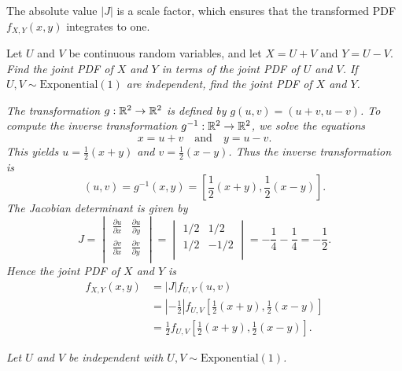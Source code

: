 \begin{remark}
The absolute value $|J|$ is a scale factor, which ensures that the transformed PDF $f_{X,Y}(x,y)$ integrates to one.
\end{remark}

\begin{example}
Let $U$ and $V$ be continuous random variables, and let $X=U+V$ and $Y=U-V$. 
\ben
\it Find the joint PDF of $X$ and $Y$ in terms of the joint PDF of $U$ and $V$.
\it If $U,V\sim\text{Exponential}(1)$ are independent, find the joint PDF of $X$ and $Y$.
\een
\end{example}

\begin{solution}
\ben

\it %
\bit
\it The transformation $g:\mathbb{R}^2\to\mathbb{R}^2$ is defined by $g(u,v) = (u+v,u-v)$. 
\it To compute the inverse transformation $g^{-1}:\mathbb{R}^2\to\mathbb{R}^2$, we solve the equations %
\[
x=u+v \quad\text{and}\quad y=u-v.%
\]
\it This yields $u = \frac{1}{2}(x+y)$ and $v = \frac{1}{2}(x-y)$.
\it Thus the inverse transformation is 
\[
(u,v) = g^{-1}(x,y) = \left[\frac{1}{2}(x+y),\frac{1}{2}(x-y)\right].
\]
\eit
The Jacobian determinant is given by
\[
J = 
\begin{vmatrix}
\displaystyle\frac{\partial u}{\partial x} & \displaystyle\frac{\partial u}{\partial y} \\[2ex]
\displaystyle\frac{\partial v}{\partial x} & \displaystyle\frac{\partial v}{\partial y} \\
\end{vmatrix}
=
\begin{vmatrix}
1/2	& 1/2 \\
1/2 & -1/2 \\
\end{vmatrix}
= -\frac{1}{4} - \frac{1}{4} = -\frac{1}{2}.
\]
Hence the joint PDF of $X$ and $Y$ is
\begin{align*}
f_{X,Y}(x,y)
	& = |J|f_{U,V}(u,v) \\
	& = \left|-\frac{1}{2}\right| f_{U,V}\left[\frac{1}{2}(x+y),\frac{1}{2}(x-y)\right] \\
	& = \frac{1}{2}f_{U,V}\left[\frac{1}{2}(x+y),\frac{1}{2}(x-y)\right].
\end{align*}



\it %
Let $U$ and $V$ be independent with $U,V\sim\text{Exponential}(1)$.


\end{solution}
